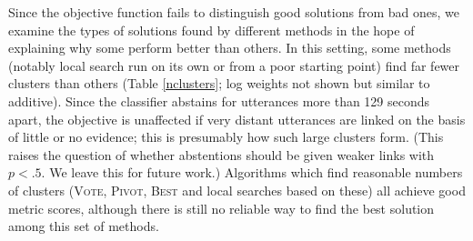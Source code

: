 \documentclass[11pt]{article}
\newcommand{\alg}[1]{\textsc{#1}}
\begin{document}
Since the objective function fails to distinguish good solutions from
bad ones, we examine the types of solutions found by different methods
in the hope of explaining why some perform better than others. In this
setting, some methods (notably local search run on its own or from a
poor starting point) find far fewer clusters than others (Table
\ref{nclusters}; log weights not shown but similar to additive). Since
the classifier abstains for utterances more than 129 seconds apart,
the objective is unaffected if very distant utterances are linked on
the basis of little or no evidence; this is presumably how such large
clusters form. (This raises the question of whether abstentions
should be given weaker links with $p < .5$. We leave this for future
work.)  Algorithms which find reasonable numbers of clusters
(\alg{Vote}, \alg{Pivot}, \alg{Best} and local searches based on
these) all achieve good metric scores, although there is still no
reliable way to find the best solution among this set of methods.
\end{document}
